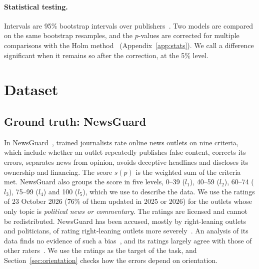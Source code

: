 \documentclass[11pt,a4paper]{article}
\begin{document}
\paragraph{Statistical testing.} Intervals are 95\% bootstrap intervals over publishers~\cite{efron1979bootstrap}. Two
models are compared on the same bootstrap resamples, and the $p$-values are corrected for multiple comparisons with the
Holm method~\cite{holm1979simple} (Appendix~\ref{app:stats}). We call a difference significant when it
remains so after the correction, at the 5\% level.

\section{Dataset}\label{sec:data}

\subsection{Ground truth: NewsGuard}\label{sec:labels}
In NewsGuard~\cite{newsguard}, trained journalists rate online news outlets on nine criteria, which include whether an
outlet repeatedly publishes false content, corrects its errors, separates news from opinion, avoids deceptive headlines
and discloses its ownership and financing. The score $s(p)$ is the weighted sum of the criteria met. NewsGuard also
groups the score in five levels, 0--39 ($l_1$), 40--59 ($l_2$), 60--74 ($l_3$), 75--99 ($l_4$) and 100 ($l_5$), which we
use to describe the data. We use the ratings of 23 October 2026 (76\% of them updated in 2025 or 2026) for the outlets
whose only topic is \emph{political news or commentary}. The ratings are licensed and cannot be redistributed. NewsGuard
has been accused, mostly by right-leaning outlets and politicians, of rating right-leaning outlets more
severely~\cite{oremus2024newsguard}. An analysis of its data finds no evidence of such a bias~\cite{luhring2025best},
and its ratings largely agree with those of other raters~\cite{lin2023high}. We use the ratings as the target of the
task, and Section~\ref{sec:orientation} checks how the errors depend on orientation.
\end{document}
